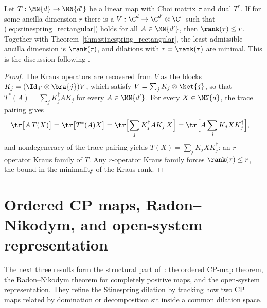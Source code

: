 \begin{lemma}\label{lem:stinespring_rectangular_least_dim}
    \leanok
    Let $T:\MN{d}\to\MN{d'}$ be a linear map with Choi matrix $\tau$ and dual
    $T^*$. If for some ancilla dimension $r$ there is a
    $V:\C^{d}\to\C^{d'}\otimes\C^{r}$ such that
    (\ref{eq:stinespring_rectangular}) holds for all $A\in\MN{d'}$, then
    $\rank(\tau)\le r$. Together with
    Theorem~\ref{thm:stinespring_rectangular}, the least admissible ancilla
    dimension is $\rank(\tau)$, and dilations with $r=\rank(\tau)$ are
    minimal. This is the discussion following
    \cite[Theorem~2.2]{Wolf2012Quantum}.
\end{lemma}

\begin{proof}
    \leanok
    The Kraus operators are recovered from $V$ as the blocks
    $K_j=(\Id_{d'}\otimes\bra{j})V$, which satisfy
    $V=\sum_jK_j\otimes\ket{j}$, so that
    $T^*(A)=\sum_jK_j^\dagger AK_j$ for every $A\in\MN{d'}$. For every
    $X\in\MN{d}$, the trace pairing gives
    \begin{align}
        \tr\bigl[A\,T(X)\bigr]
        &=\tr\bigl[T^*(A)X\bigr]
          =\tr\Bigl[\sum_jK_j^\dagger AK_j\,X\Bigr]
          =\tr\Bigl[A\sum_jK_jXK_j^\dagger\Bigr],
        \label{eq:stinespring_rectangular_least_pairing}
    \end{align}
    and nondegeneracy of the trace pairing yields
    $T(X)=\sum_jK_jXK_j^\dagger$: an $r$-operator Kraus family of $T$. Any
    $r$-operator Kraus family forces $\rank(\tau)\le r$, the bound in the
    minimality of the Kraus rank.
\end{proof}

\section{Ordered CP maps, Radon--Nikodym, and open-system representation}
\label{sec:ordered_cp}

The next three results form the structural part of~\cite[Theorems~2.3--2.5]{Wolf2012Quantum}:
the ordered CP-map theorem, the Radon--Nikodym theorem for completely positive
maps, and the open-system representation. They refine the Stinespring dilation
by tracking how two CP maps related by domination or decomposition sit inside
a common dilation space.

